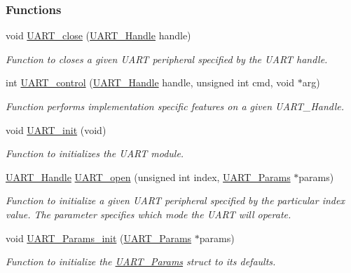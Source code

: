 \subsubsection*{Functions}
\begin{DoxyCompactItemize}
\item 
void \hyperlink{_u_a_r_t_8h_a6b49b65f3db709c408dc4db23a68895d}{U\-A\-R\-T\-\_\-close} (\hyperlink{_u_a_r_t_8h_a13cc669fae768d8212e6491ce71b28af}{U\-A\-R\-T\-\_\-\-Handle} handle)
\begin{DoxyCompactList}\small\item\em Function to closes a given U\-A\-R\-T peripheral specified by the U\-A\-R\-T handle. \end{DoxyCompactList}\item 
int \hyperlink{_u_a_r_t_8h_a9de3c26cfe4ce6b7f350a6ea6e16801d}{U\-A\-R\-T\-\_\-control} (\hyperlink{_u_a_r_t_8h_a13cc669fae768d8212e6491ce71b28af}{U\-A\-R\-T\-\_\-\-Handle} handle, unsigned int cmd, void $\ast$arg)
\begin{DoxyCompactList}\small\item\em Function performs implementation specific features on a given U\-A\-R\-T\-\_\-\-Handle. \end{DoxyCompactList}\item 
void \hyperlink{_u_a_r_t_8h_ab60a36f7295d704926120d22f806dcd1}{U\-A\-R\-T\-\_\-init} (void)
\begin{DoxyCompactList}\small\item\em Function to initializes the U\-A\-R\-T module. \end{DoxyCompactList}\item 
\hyperlink{_u_a_r_t_8h_a13cc669fae768d8212e6491ce71b28af}{U\-A\-R\-T\-\_\-\-Handle} \hyperlink{_u_a_r_t_8h_a0442ea1ec23901168da31726bb3254c1}{U\-A\-R\-T\-\_\-open} (unsigned int index, \hyperlink{struct_u_a_r_t___params}{U\-A\-R\-T\-\_\-\-Params} $\ast$params)
\begin{DoxyCompactList}\small\item\em Function to initialize a given U\-A\-R\-T peripheral specified by the particular index value. The parameter specifies which mode the U\-A\-R\-T will operate. \end{DoxyCompactList}\item 
void \hyperlink{_u_a_r_t_8h_a40e5c0823bb7ffd2e8fbf19f9f20b399}{U\-A\-R\-T\-\_\-\-Params\-\_\-init} (\hyperlink{struct_u_a_r_t___params}{U\-A\-R\-T\-\_\-\-Params} $\ast$params)
\begin{DoxyCompactList}\small\item\em Function to initialize the \hyperlink{struct_u_a_r_t___params}{U\-A\-R\-T\-\_\-\-Params} struct to its defaults. \end{DoxyCompactList}\item 

\end{DoxyCompactItemize}
